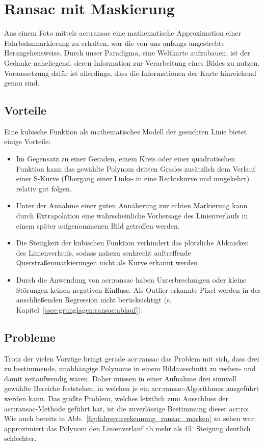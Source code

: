 \section{Ransac mit Maskierung \dcfirstauthorshort}
\label{sec:evaluation:ransac}

Aus einem Foto mittels \gls{acr:ransac} eine mathematische Approximation einer Fahrbahnmarkierung zu erhalten, war die von uns anfangs angestrebte Herangehensweise. Durch unser Paradigma, eine Weltkarte aufzubauen, ist der Gedanke naheliegend, deren Information zur Verarbeitung eines Bildes zu nutzen. Voraussetzung dafür ist allerdings, dass die Informationen der Karte hinreichend genau sind.

\subsection{Vorteile}
Eine kubische Funktion als mathematisches Modell der gesuchten Linie bietet einige Vorteile:
\begin{itemize}
\item Im Gegensatz zu einer Geraden, einem Kreis oder einer quadratischen Funktion kann das gewählte Polynom dritten Grades zusätzlich dem Verlauf einer S-Kurve (Übergang einer Links- in eine Rechtskurve und umgekehrt) relativ gut folgen. 
\item Unter der Annahme einer guten Annäherung zur echten Markierung kann durch Extrapolation eine wahrscheinliche Vorhersage des Linienverlaufs in einem später aufgenommenen Bild getroffen werden. 
\item Die Stetigkeit der kubischen Funktion verhindert das plötzliche Abknicken des Linienverlaufs, sodass nahezu senkrecht auftreffende Querstraßenmarkierungen nicht als Kurve erkannt werden
\item Durch die Anwendung von \gls{acr:ransac} haben Unterbrechungen oder kleine Störungen keinen negativen Einfluss. Als Outlier erkannte Pixel werden in der anschließenden Regression nicht berücksichtigt (s. Kapitel~\ref{ssec:grunglagen:ransac:ablauf}).
\end{itemize}

\subsection{Probleme}
\label{ssec:evaluation:ransac:probleme}
Trotz der vielen Vorzüge bringt gerade \gls{acr:ransac} das Problem mit sich, dass drei zu bestimmende, unabhängige Polynome in einem Bildausschnitt zu rechen- und damit zeitaufwendig wären. Daher müssen in einer Aufnahme drei sinnvoll gewählte Bereiche feststehen, in welchen je ein \gls{acr:ransac}-Algorithmus ausgeführt werden kann. 
Das größte Problem, welches letztlich zum Ausschluss der \gls{acr:ransac}-Methode geführt hat, ist die zuverlässige Bestimmung dieser \gls{acr:roi}. Wie auch bereits in Abb.~\ref{fig:fahrspurerkennung_ransac_masken} zu sehen war, approximiert das Polynom den Linienverlauf ab mehr als 45\(^\circ\) Steigung deutlich schlechter. 

